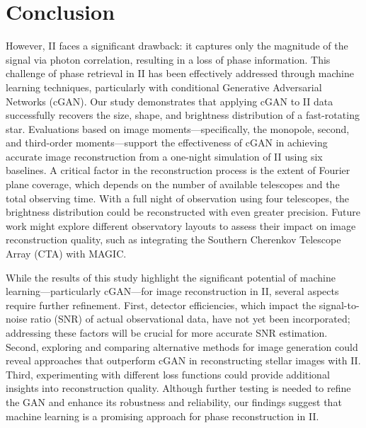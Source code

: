 \section{Conclusion}

However, II faces a significant drawback: it captures only the magnitude of the signal via photon correlation, resulting in a loss of phase information. This challenge of phase retrieval in II has been effectively addressed through machine learning techniques, particularly with conditional Generative Adversarial Networks (cGAN). Our study demonstrates that applying cGAN to II data successfully recovers the size, shape, and brightness distribution of a fast-rotating star. Evaluations based on image moments—specifically, the monopole, second, and third-order moments—support the effectiveness of cGAN in achieving accurate image reconstruction from a one-night simulation of II using six baselines. A critical factor in the reconstruction process is the extent of Fourier plane coverage, which depends on the number of available telescopes and the total observing time. With a full night of observation using four telescopes, the brightness distribution could be reconstructed with even greater precision. Future work might explore different observatory layouts to assess their impact on image reconstruction quality, such as integrating the Southern Cherenkov Telescope Array (CTA) with MAGIC.

While the results of this study highlight the significant potential of machine learning—particularly cGAN—for image reconstruction in II, several aspects require further refinement. First, detector efficiencies, which impact the signal-to-noise ratio (SNR) of actual observational data, have not yet been incorporated; addressing these factors will be crucial for more accurate SNR estimation. Second, exploring and comparing alternative methods for image generation could reveal approaches that outperform cGAN in reconstructing stellar images with II. Third, experimenting with different loss functions could provide additional insights into reconstruction quality. Although further testing is needed to refine the GAN and enhance its robustness and reliability, our findings suggest that machine learning is a promising approach for phase reconstruction in II.
